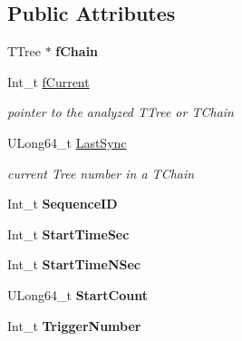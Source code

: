 \subsection*{Public Attributes}
\begin{DoxyCompactItemize}
\item 
\hypertarget{classPMTData_ab6f5a263a14b5dd5f6e35ca1df4ca7f2}{T\-Tree $\ast$ {\bfseries f\-Chain}}\label{classPMTData_ab6f5a263a14b5dd5f6e35ca1df4ca7f2}

\item 
\hypertarget{classPMTData_a7745fca9e7cc842de4b0b57407b77f88}{Int\-\_\-t \hyperlink{classPMTData_a7745fca9e7cc842de4b0b57407b77f88}{f\-Current}}\label{classPMTData_a7745fca9e7cc842de4b0b57407b77f88}

\begin{DoxyCompactList}\small\item\em pointer to the analyzed T\-Tree or T\-Chain \end{DoxyCompactList}\item 
\hypertarget{classPMTData_aca229b56ff1777b30c95f5325cc55292}{U\-Long64\-\_\-t \hyperlink{classPMTData_aca229b56ff1777b30c95f5325cc55292}{Last\-Sync}}\label{classPMTData_aca229b56ff1777b30c95f5325cc55292}

\begin{DoxyCompactList}\small\item\em current Tree number in a T\-Chain \end{DoxyCompactList}\item 
\hypertarget{classPMTData_a5c6be7f17efe083ea5a5df3921ddef80}{Int\-\_\-t {\bfseries Sequence\-I\-D}}\label{classPMTData_a5c6be7f17efe083ea5a5df3921ddef80}

\item 
\hypertarget{classPMTData_a4c0df523145834151778799e8f3fa223}{Int\-\_\-t {\bfseries Start\-Time\-Sec}}\label{classPMTData_a4c0df523145834151778799e8f3fa223}

\item 
\hypertarget{classPMTData_aa2983c2163daa5b6460706e00d5f9097}{Int\-\_\-t {\bfseries Start\-Time\-N\-Sec}}\label{classPMTData_aa2983c2163daa5b6460706e00d5f9097}

\item 
\hypertarget{classPMTData_a6aff50e9830483d158ec19db4e739144}{U\-Long64\-\_\-t {\bfseries Start\-Count}}\label{classPMTData_a6aff50e9830483d158ec19db4e739144}

\item 
\hypertarget{classPMTData_a7731940755b54f0aaa070918452f9808}{Int\-\_\-t {\bfseries Trigger\-Number}}\label{classPMTData_a7731940755b54f0aaa070918452f9808}


\end{DoxyCompactItemize}
